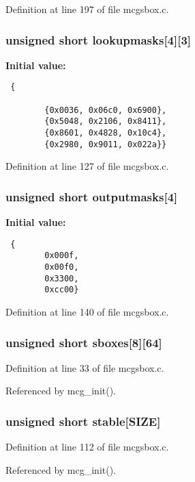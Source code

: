 Definition at line 197 of file mcgsbox.c.
\subsubsection{\setlength{\rightskip}{0pt plus 5cm}unsigned short {\bf lookupmasks}[4][3]}\label{mcgsbox_8c_a2}


{\bf Initial value:}

\footnotesize\begin{verbatim} {
        
        {0x0036, 0x06c0, 0x6900},       
        {0x5048, 0x2106, 0x8411},       
        {0x8601, 0x4828, 0x10c4},       
        {0x2980, 0x9011, 0x022a}}
\end{verbatim}\normalsize 


Definition at line 127 of file mcgsbox.c.
\subsubsection{\setlength{\rightskip}{0pt plus 5cm}unsigned short {\bf outputmasks}[4]}\label{mcgsbox_8c_a3}


{\bf Initial value:}

\footnotesize\begin{verbatim} {
        0x000f,  
        0x00f0,  
        0x3300,  
        0xcc00}
\end{verbatim}\normalsize 


Definition at line 140 of file mcgsbox.c.
\subsubsection{\setlength{\rightskip}{0pt plus 5cm}unsigned short {\bf sboxes}[8][64]}\label{mcgsbox_8c_a0}




Definition at line 33 of file mcgsbox.c.

Referenced by mcg\_\-init().
\subsubsection{\setlength{\rightskip}{0pt plus 5cm}unsigned short {\bf stable}[SIZE]}\label{mcgsbox_8c_a1}




Definition at line 112 of file mcgsbox.c.

Referenced by mcg\_\-init().